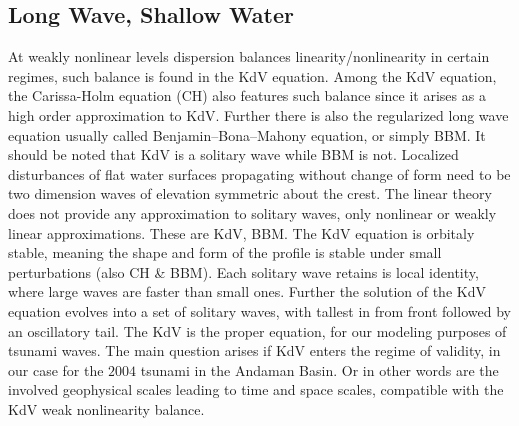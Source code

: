 \subsection{Long Wave, Shallow Water}
At weakly nonlinear levels dispersion balances linearity/nonlinearity in
certain regimes, such balance is found in the KdV equation. Among the KdV
equation, the Carissa-Holm equation (CH) also features such balance since it
arises as a high order approximation to KdV. Further there is also the
regularized long wave equation usually called Benjamin–Bona–Mahony equation, or simply
BBM. It should be noted that KdV is a solitary wave while BBM is not.
Localized disturbances of flat water surfaces propagating without change of
form need to be two dimension waves of elevation symmetric about the crest.
The linear theory does not provide any approximation to solitary waves, only
nonlinear or weakly linear approximations. These are KdV, BBM. The KdV
equation is orbitaly stable, meaning the shape and form of the profile is
stable under small perturbations (also CH \& BBM). Each solitary wave retains
is local identity, where large waves are faster than small ones. Further the
solution of the KdV equation evolves into a set of solitary waves, with
tallest in from front followed by an oscillatory tail. The KdV is the
proper equation, for our modeling purposes of tsunami waves. The main
question arises if KdV enters the regime of validity, in our case for the
$2004$ tsunami in the Andaman Basin. Or in other words are the involved
geophysical scales leading to time and space scales, compatible with
the KdV weak nonlinearity balance.
